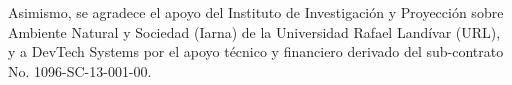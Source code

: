 Asimismo, se agradece el apoyo del Instituto de Investigación y Proyección sobre Ambiente Natural y Sociedad (Iarna) de la Universidad Rafael Landívar (URL), y a DevTech Systems por el apoyo técnico y financiero derivado del sub-contrato No. 1096-SC-13-001-00.\\[16mm]






$\ $\\[1cm]
\newpage
\renewcommand{\contentsname}{Contenidos}
\tableofcontents
\clearpage
\thispagestyle{estandar}
\listofexample


